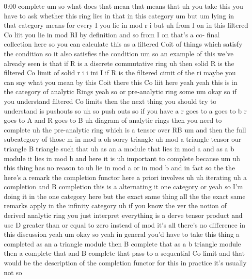 \begin{unfinished}{0:00}
complete
um  so  what  does  that  mean  that  means
that  uh  you  take  this  you  have  to  ask
whether  this  ring  lies  in  that  in  this
category  um  but  um  lying  in  that
category  means  for  every  I  you  lie  in
mod  r  i  but  uh  from  I  on  in  this
filtered  Co  liit  you  lie  in  mod  RI  by
definition  and  so  from  I  on  that's  a  co-
final  collection  here  so  you  can
calculate  this  as  a  filtered  Coit  of
things  which  satisfy  the  condition  so  it
also  satisfies  the  condition
um  so  an  example  of  this  we've  already
seen  is  that  if  R  is  a  discrete
commutative
ring  uh  then  solid
R  is  the  filtered  Co
limit  of
solid  r  i  i  ini  I  if  R  is  the  filtered
cimit  of  the
ri  maybe  you  can  say  what  you  mean  by
this  Coit  there  this  Co  liit
here  yeah  yeah  this  is  in  the  category
of  analytic
Rings  yeah  so  or  pre-analytic  ring
some  um
okay  so  if  you  understand  filtered  Co
limits  then  the  next  thing  you  should
try  to  understand  is  pushouts  so
uh  so  push
outs  so  if  you  have  a  r  goes  to  a  goes
to  b  r  goes  to  A  and  R  goes  to  B  uh
diagram  of  analytic  rings  then  you  need
to
complete
uh  the  pre-analytic  ring  which  is  a
tensor  over
RB  um  and  then  the  full  subcategory  of
those  m  in  mod  a  oh  sorry
triangle  uh
mod  a  triangle  tensor  our  triangle  B
triangle  such  that  uh  as  an  a  module
that  lies  in  mod  a  and  as  a  b  module  it
lies  in  mod
b
and  here  it  is  uh  important  to
complete  because
um  uh  this  thing  has  no  reason
to  uh  lie  in  mod  a  or  in  mod  b  and  in
fact  so  the  the  here's  a  remark  the
completion
functor  here  a
priori  involves  uh  uh
iterating  uh  a  completion  and  B
completion  this  is  a
alternating  it  one  category  or  yeah  so
I'm  doing  it  in  the  one  category  here
but  the  exact  same  thing  all  the  the
exact  same  remarks  apply  in  the  infinity
category  uh  if  you  know  the  ver  the
notion  of  derived  analytic  ring  you  just
interpret  everything  is  a  derve  tensor
product  and  use  D  greater  than  or  equal
to  zero  instead  of  mod  it's  all  there's
no  difference  in  this
discussion
yeah
um  okay  so  yeah  in  general  you'd  have  to
take  this  thing  a  completed  as  an  a
triangle  module  then  B  complete  that  as
a  b  triangle  module  then  a  complete  that
and  B  complete  that  pass  to  a  sequential
Co  limit  and  that  would  be  the
description  of  the  completion  functor
for  this  in  practice  it's  usually  not  so

\end{unfinished}
